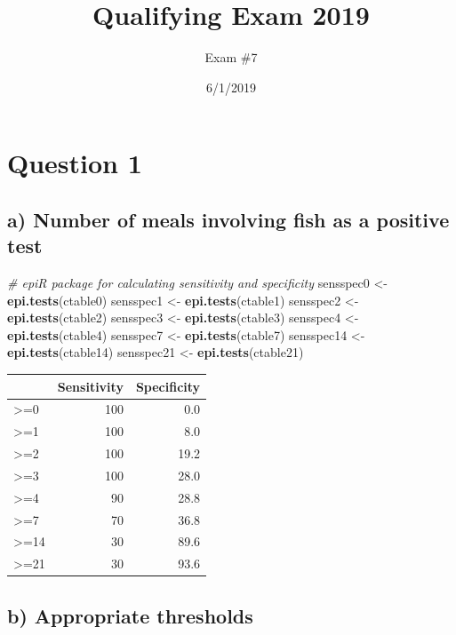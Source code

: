 \documentclass[]{article}
\title{Qualifying Exam 2019}
\author{Exam \#7}
\date{6/1/2019}
\newenvironment{Shaded}{\begin{snugshade}}{\end{snugshade}}
\newcommand{\CommentTok}[1]{\textcolor[rgb]{0.56,0.35,0.01}{\textit{#1}}}
\newcommand{\KeywordTok}[1]{\textcolor[rgb]{0.13,0.29,0.53}{\textbf{#1}}}
\newcommand{\NormalTok}[1]{#1}
\newcommand{\StringTok}[1]{\textcolor[rgb]{0.31,0.60,0.02}{#1}}
\begin{document}
\maketitle

\hypertarget{question-1}{%
\section{Question 1}\label{question-1}}

\hypertarget{a-number-of-meals-involving-fish-as-a-positive-test}{%
\subsection{a) Number of meals involving fish as a positive
test}\label{a-number-of-meals-involving-fish-as-a-positive-test}}

\begin{Shaded}
\begin{Highlighting}[]
\CommentTok{# epiR package for calculating sensitivity and specificity}
\NormalTok{sensspec0 <-}\StringTok{ }\KeywordTok{epi.tests}\NormalTok{(ctable0)}
\NormalTok{sensspec1 <-}\StringTok{ }\KeywordTok{epi.tests}\NormalTok{(ctable1)}
\NormalTok{sensspec2 <-}\StringTok{ }\KeywordTok{epi.tests}\NormalTok{(ctable2)}
\NormalTok{sensspec3 <-}\StringTok{ }\KeywordTok{epi.tests}\NormalTok{(ctable3)}
\NormalTok{sensspec4 <-}\StringTok{ }\KeywordTok{epi.tests}\NormalTok{(ctable4)}
\NormalTok{sensspec7 <-}\StringTok{ }\KeywordTok{epi.tests}\NormalTok{(ctable7)}
\NormalTok{sensspec14 <-}\StringTok{ }\KeywordTok{epi.tests}\NormalTok{(ctable14)}
\NormalTok{sensspec21 <-}\StringTok{ }\KeywordTok{epi.tests}\NormalTok{(ctable21)}
\end{Highlighting}
\end{Shaded}

\begin{longtable}[]{@{}lrr@{}}
\toprule
& Sensitivity & Specificity\tabularnewline
\midrule
\endhead
\textgreater{}=0 & 100 & 0.0\tabularnewline
\textgreater{}=1 & 100 & 8.0\tabularnewline
\textgreater{}=2 & 100 & 19.2\tabularnewline
\textgreater{}=3 & 100 & 28.0\tabularnewline
\textgreater{}=4 & 90 & 28.8\tabularnewline
\textgreater{}=7 & 70 & 36.8\tabularnewline
\textgreater{}=14 & 30 & 89.6\tabularnewline
\textgreater{}=21 & 30 & 93.6\tabularnewline
\bottomrule
\end{longtable}

\hypertarget{b-appropriate-thresholds}{%
\subsection{b) Appropriate thresholds}\label{b-appropriate-thresholds}}
\end{document}
